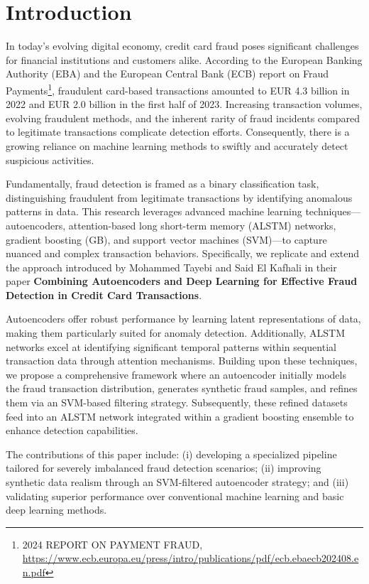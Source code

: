 \section{Introduction}

In today's evolving digital economy, credit card fraud poses significant challenges for financial institutions and customers alike. According to the European Banking Authority (EBA) and the European Central Bank (ECB) report on Fraud Payments\footnote{2024 REPORT ON PAYMENT FRAUD, \url{https://www.ecb.europa.eu/press/intro/publications/pdf/ecb.ebaecb202408.en.pdf}}, fraudulent card-based transactions amounted to EUR 4.3 billion in 2022 and EUR 2.0 billion in the first half of 2023. Increasing transaction volumes, evolving fraudulent methods, and the inherent rarity of fraud incidents compared to legitimate transactions complicate detection efforts. Consequently, there is a growing reliance on machine learning methods to swiftly and accurately detect suspicious activities.

Fundamentally, fraud detection is framed as a binary classification task, distinguishing fraudulent from legitimate transactions by identifying anomalous patterns in data. This research leverages advanced machine learning techniques—autoencoders, attention-based long short-term memory (ALSTM) networks, gradient boosting (GB), and support vector machines (SVM)—to capture nuanced and complex transaction behaviors. Specifically, we replicate and extend the approach introduced by Mohammed Tayebi and Said El Kafhali in their paper \textbf{Combining Autoencoders and Deep Learning for Effective Fraud Detection in Credit Card Transactions}\cite{Tayebi2025}.

Autoencoders offer robust performance by learning latent representations of data, making them particularly suited for anomaly detection. Additionally, ALSTM networks excel at identifying significant temporal patterns within sequential transaction data through attention mechanisms. Building upon these techniques, we propose a comprehensive framework where an autoencoder initially models the fraud transaction distribution, generates synthetic fraud samples, and refines them via an SVM-based filtering strategy. Subsequently, these refined datasets feed into an ALSTM network integrated within a gradient boosting ensemble to enhance detection capabilities.

The contributions of this paper include: (i) developing a specialized pipeline tailored for severely imbalanced fraud detection scenarios; (ii) improving synthetic data realism through an SVM-filtered autoencoder strategy; and (iii) validating superior performance over conventional machine learning and basic deep learning methods.